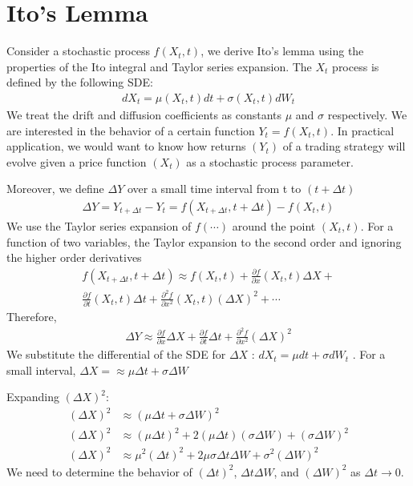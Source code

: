 \section{Ito's Lemma}
Consider a stochastic process $f(X_t, t)$, we derive Ito's lemma \cite{wiki:itos-lemma} using the properties of the Ito integral and Taylor series expansion. The $X_t$ process is defined by the following SDE:
\begin{align} \label{eq:stoch_diff_eq}
dX_t = \mu(X_t,t)dt + \sigma(X_t,t)dW_t
\end{align}
We treat the drift and diffusion coefficients as constants $\mu$ and $\sigma$ respectively. We are interested in the behavior of a certain function $Y_t=f(X_t, t)$. In practical application, we would want to know how returns $(Y_t)$ of a trading strategy will evolve given a price function $(X_t)$ as a stochastic process parameter.

Moreover, we define $\Delta Y$ over a small time interval from t to $(t+\Delta t)$
\begin{align*}
\Delta Y = Y_{t+\Delta t} - Y_t = f(X_{t+\Delta t}, t+\Delta t) - f(X_t, t)
\end{align*}
We use the Taylor series expansion of $f(\cdots)$ around the point $(X_t, t)$.  For a function of two variables, the Taylor expansion to the second order and ignoring the higher order derivatives
\begin{align*}
f(X_{t+\Delta t}, t+\Delta t) \approx f(X_t,t) + \frac{\partial f}{\partial x}(X_t, t) \Delta X + \\\frac{\partial f}{\partial t} (X_t,t) \Delta t + \frac{\partial^2f}{\partial x^2}(X_t,t)(\Delta X)^2 + \cdots
\end{align*}
Therefore,
\begin{align*}
\Delta Y \approx \frac{\partial f}{\partial x}\Delta X + \frac{\partial f}{\partial t}\Delta t + \frac{\partial^2f}{\partial x^2}(\Delta X)^2
\end{align*}
We substitute the differential of the SDE for $\Delta X$ : $dX_t=\mu dt + \sigma dW_t$ . For a small interval, $\Delta X =\approx \mu \Delta t + \sigma \Delta W$

Expanding $(\Delta X)^2$:
\begin{align*}
(\Delta X)^2 &\approx (\mu \Delta t + \sigma \Delta W)^2\\
(\Delta X)^2 &\approx (\mu \Delta t)^2 + 2 (\mu \Delta t)(\sigma \Delta W) + (\sigma \Delta W)^2\\
(\Delta X)^2 &\approx \mu^2(\Delta t)^2 + 2\mu\sigma \Delta t \Delta W + \sigma^2 (\Delta W)^2
\end{align*}
We need to determine the behavior of $(\Delta t)^2$, $\Delta t \Delta W$, and $(\Delta W)^2$ as $\Delta t \rightarrow 0$.


